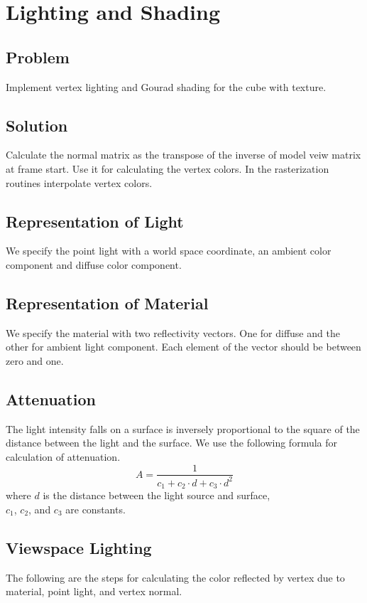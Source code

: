 \chapter{Lighting and Shading}
\section{Problem}
Implement vertex lighting and Gourad shading for the cube with texture.
\section{Solution}
Calculate the normal matrix as the transpose of the inverse of model veiw matrix at frame start. Use it for calculating the vertex colors. In the rasterization routines interpolate vertex colors.
\section{Representation of Light}
We specify the point light with a world space coordinate, an ambient color component and diffuse color component. 
\section{Representation of Material}
We specify the material with two reflectivity vectors. One for diffuse and the other for ambient light component. Each element of the vector should be between zero and one.
\section{Attenuation}
The light intensity falls on a surface is inversely proportional to the square of the distance between the light and the surface. We use the following formula for calculation of attenuation.
\[
    A = \frac{1}{c_1 + c_2\cdot d + c_3 \cdot d^2}
\]
where $d$ is the distance between the light source and surface,\\
$c_1$, $c_2$, and $c_3$ are constants.

\section{Viewspace Lighting}
The following are the steps for calculating the color reflected by vertex due to material, point light, and vertex normal.
